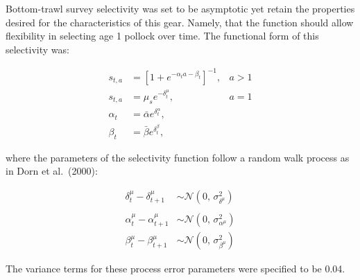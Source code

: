 \documentclass[11pt,
  english,
  a4paper,
]{article}
\begin{document}
Bottom-trawl survey selectivity was set to be asymptotic yet retain the properties desired for the characteristics of this gear. Namely, that the function should allow flexibility in selecting age 1 pollock over time. The functional form of this selectivity was:

\leavevmode\tagmcend\tagstructend\par


\begin{align}
    s_{t,a}     &= \left[ 1+e^{-\alpha_ta-\beta_t} \right]^{-1} , & a>1 \\
    s_{t,a}     &= \mu_se^{-\delta^\mu_t},                        & a=1 \\
    \alpha_{t}  &= \bar \alpha e^{\delta^\alpha_t},                     \\
    \beta_{t}  &= \bar \beta e^{\delta^\beta_t},                        
\end{align}

\leavevmode\tagmcend\tagstructend\par


where the parameters of the selectivity function follow a random walk process as in Dorn et al.~(2000):

\leavevmode\tagmcend\tagstructend\par


\begin{align}
    \delta_t^\mu  -  \delta_{t+1}^\mu     &\sim \mathcal{N}(0,\,\sigma_{\delta^\mu}^{2}) \\
    \\
    \alpha_t^\mu  -  \alpha_{t+1}^\mu     &\sim \mathcal{N}(0,\,\sigma_{\alpha^\mu}^{2}) \\
    \beta_t^\mu  -  \beta_{t+1}^\mu     &\sim \mathcal{N}(0,\,\sigma_{\beta^\mu}^{2}) 
\end{align}

\leavevmode\tagmcend\tagstructend\par


The variance terms for these process error parameters were specified to be 0.04.

\leavevmode\tagmcend\tagstructend\par
\end{document}
